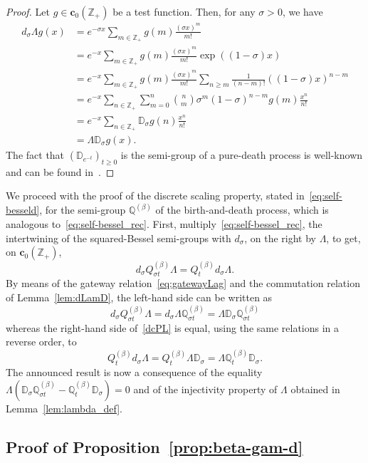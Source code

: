 \documentclass[10pt]{amsart}
\theoremstyle{definition}\newtheorem{defi}[theo]{Definition}\newtheorem{rema}[theo]{Remark}\newtheorem{exam}[theo]{Example}\newtheorem{exem}[theo]{Example}\newtheorem{nota}[theo]{Notation}
\newcommand{\cD}{{\discret{D}}}
\newcommand{\ZZ}{\mathbb{Z}}
\newcommand{\dBs}{{\discret{Q}}}
\newcommand{\Bs}{Q}
\newcommand{\esc}{\mathbf{c}}
\newcommand{\discret}[1]{\mathds{#1}}
\begin{document}
\begin{proof}
Let $g\in \esc_0(\ZZ_+)$ be a test function. Then, for any $\sigma>0$, we have
\begin{align*}
d_\sigma\Lambda g(x)&=e^{-\sigma x}\sum_{m\in\ZZ_+}g(m)\frac{(\sigma x)^m}{m!}\\
&=e^{-x}\sum_{m\in\ZZ_+}g(m)\frac{(\sigma x)^m}{m!}\exp((1-\sigma)x)\\
&=e^{-x}\sum_{m\in\ZZ_+}g(m)\frac{(\sigma x)^m}{m!}\sum_{n\geq m}\frac{1}{(n-m)!}((1-\sigma)x)^{n-m}\\
&=e^{-x}\sum_{n\in\ZZ_+}\sum_{m=0}^n\binom{n}{m}\sigma^m(1-\sigma)^{n-m}g(m)\frac{x^n}{n!}\\
&=e^{-x}\sum_{n\in\ZZ_+}\discret{D}_\sigma g(n)\frac{x^n}{n!}\\
&=\Lambda \discret{D}_\sigma g(x).
\end{align*}
The fact that $ (\cD_{e^{-t}})_{t \geq 0}$ is the semi-group of a pure-death process is well-known and can be found in~\cite[Proposition~3.3]{Biane-int}.
\end{proof}

We proceed with the proof of the discrete scaling property, stated in~\eqref{eq:self-besseld}, for the semi-group $\dBs^{(\beta)}$ of the birth-and-death process, which is analogous to~\eqref{eq:self-bessel_rec}. First, multiply~\eqref{eq:self-bessel_rec}, the intertwining of the squared-Bessel semi-groups with $d_\sigma$, on the right by $\Lambda$, to get, on $\esc_0(\ZZ_+)$,
\begin{equation}\label{dcPL}
d_\sigma\Bs^{(\beta)}_{\sigma t}\Lambda =\Bs_t^{(\beta)} d_\sigma\Lambda.
\end{equation}
By means of the gateway relation~\eqref{eq:gatewayLag} and the commutation relation of Lemma~\ref{lem:dLamD}, the left-hand side can be written as
\[
d_\sigma\Bs_{\sigma t}^{(\beta)}\Lambda=d_\sigma \Lambda \dBs_{\sigma t}^{(\beta)}=\Lambda \discret{D}_\sigma \dBs_{\sigma t}^{(\beta)}
\]
whereas the right-hand side of~\eqref{dcPL} is equal, using the same relations in a reverse order, to
\[
\Bs_t^{(\beta)} d_\sigma\Lambda=\Bs_t^{(\beta)}\Lambda \discret{D}_\sigma =\Lambda \dBs_t^{(\beta)} \discret{D}_\sigma.
\]
The announced result is now a consequence of the equality $\Lambda(\discret{D}_\sigma \dBs_{\sigma t}^{(\beta)}-\dBs_t^{(\beta)} \discret{D}_\sigma)=0$ and of the injectivity property of $\Lambda$ obtained in Lemma~\ref{lem:lambda_def}.

\subsection{Proof of Proposition~\ref{prop:beta-gam-d}}
\end{document}
